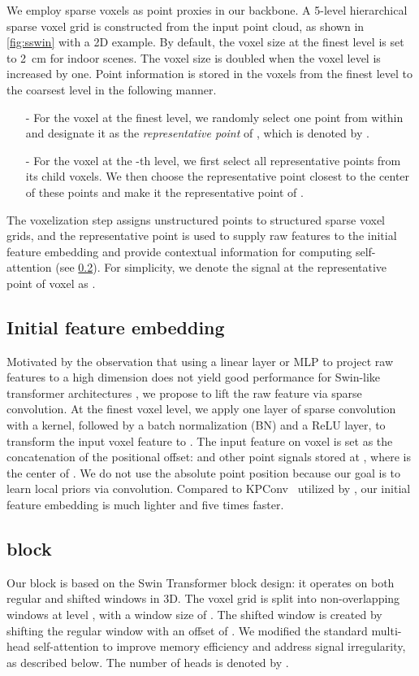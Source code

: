 \documentclass[10pt,twocolumn,letterpaper]{article}
\begin{document}
 We employ sparse voxels as point proxies in our backbone. A 5-level hierarchical sparse voxel grid is constructed from the input point cloud, as shown in \cref{fig:sswin} with a 2D example. By default, the voxel size at the finest level is set to \SI{2}{\centi\meter} for indoor scenes. The voxel size is doubled when the voxel level is increased by one. Point information is stored in the voxels from the finest level to the coarsest level in the following manner.
\begin{enumerate}[leftmargin=*]\item[-] For the voxel  at the finest level, we randomly select one point from within  and designate it as the \emph{representative point} of , which is denoted by .
    \item[-] For the voxel  at the -th level, we first select all representative points from its child voxels. We then choose the representative point closest to the center of these points and make it the representative point of .
\end{enumerate}
The voxelization step assigns unstructured points to structured sparse voxel grids, and the representative point is used to supply raw features to the initial feature embedding and provide contextual information for computing {\SST} self-attention (see \cref{subsec:block}). For simplicity, we denote the signal at the representative point of voxel  as .

\subsection{Initial feature embedding} \label{subsec:initembedding}
Motivated by the observation that using a linear layer or MLP to project raw features to a high dimension does not yield good performance for Swin-like transformer architectures \cite{lai2022stratified}, we propose to lift the raw feature via sparse convolution. At the finest voxel level, we apply one layer of sparse convolution with a  kernel, followed by a batch normalization (BN) and a ReLU layer, to transform the input voxel feature to . The input feature on voxel  is set as the concatenation of the positional offset:  and other point signals stored at , where  is the center of . We do not use the absolute point position because our goal is to learn local priors via convolution. Compared to KPConv~\cite{Thomas2019} utilized by \cite{lai2022stratified}, our initial feature embedding is much lighter and five times faster.

\subsection{{\SST} block} \label{subsec:block}
Our {\SST} block is based on the Swin Transformer block design: it operates on both regular and shifted windows in 3D. The voxel grid is split into non-overlapping windows at level , with a window size of . The shifted window is created by shifting the regular window with an offset of . We modified the standard multi-head self-attention to improve memory efficiency and address signal irregularity, as described below. The number of heads is denoted by .
\end{document}
